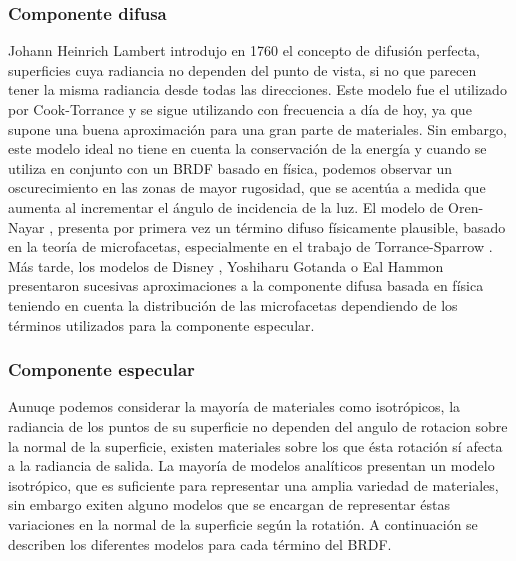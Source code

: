         \subsubsection{Componente difusa}
            Johann Heinrich Lambert introdujo en 1760 \autocite{lambert} el concepto de difusi\'on perfecta, superficies cuya radiancia no
            dependen del punto de vista, si no que parecen tener la misma radiancia desde todas las direcciones. Este modelo fue el utilizado
            por Cook-Torrance \autocite{cooktorrance} y se sigue utilizando con frecuencia a d\'ia de hoy, ya que supone una buena
            aproximaci\'on para una gran parte de materiales. Sin embargo, este modelo ideal no tiene en cuenta la conservaci\'on
            de la energ\'ia y cuando se utiliza en conjunto con un BRDF basado en f\'isica, podemos observar un oscurecimiento
            en las zonas de mayor rugosidad, que se acent\'ua a medida que aumenta al incrementar el \'angulo de incidencia de la luz.
            El modelo de Oren-Nayar \autocite{orennayar}, presenta por primera vez un t\'ermino difuso f\'isicamente plausible,
            basado en la teor\'ia de microfacetas, especialmente en el trabajo de Torrance-Sparrow \autocite{torrancesparrow}. M\'as
            tarde, los modelos de Disney \autocite{disney12} \autocite{disney15}, Yoshiharu Gotanda \autocite{gotanda14} o Eal Hammon
            \autocite{earlhammon} presentaron sucesivas aproximaciones a la componente difusa basada en f\'isica teniendo en cuenta la
            distribuci\'on de las microfacetas dependiendo de los t\'erminos utilizados para la componente especular.

        \subsubsection{Componente especular}
        Aunuqe podemos considerar la mayor\'ia de materiales como isotr\'opicos, la radiancia de los puntos de su superficie no dependen
        del angulo de rotacion sobre la normal de la superficie, existen materiales sobre los que \'esta rotaci\'on s\'i afecta
        a la radiancia de salida. La mayor\'ia de modelos anal\'iticos presentan un modelo isotr\'opico, que es suficiente para
        representar una amplia variedad de materiales, sin embargo exiten alguno modelos que se encargan de representar \'estas
        variaciones en la normal de la superficie seg\'un la rotati\'on. A continuaci\'on se describen los diferentes modelos
        para cada t\'ermino del BRDF.

